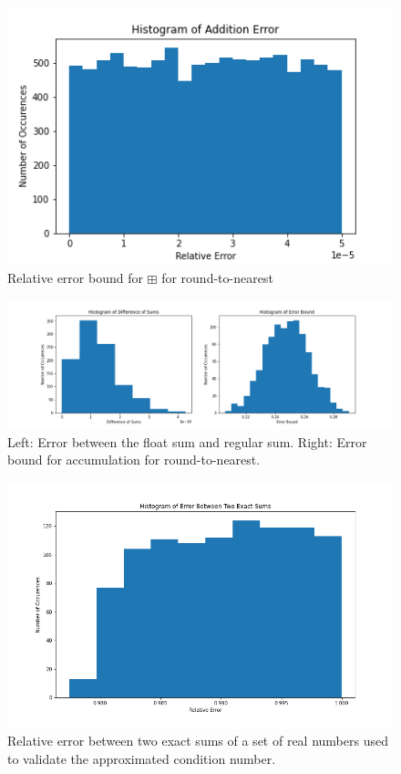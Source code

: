 \documentclass[11pt]{article}
\begin{document}
\begin{figure}[h!]
	\centering
	\includegraphics[width=0.8\linewidth]{../figures/Correctness Histogram}
	\caption{Relative error bound for $\boxplus$ for round-to-nearest}
	\label{fig:correctness}
\end{figure}

\begin{figure}[h!]
	\centering
	\includegraphics[width=1.2\linewidth]{../figures/Accumulation Histogram}
	\caption{Left: Error between the float sum and regular sum. Right: Error bound for accumulation for round-to-nearest.}
	\label{fig:accumulation}
\end{figure}

\begin{figure}[h!]
	\centering
	\includegraphics[width=\linewidth]{../figures/Condition Number Histogram}
	\caption{Relative error between two exact sums of a set of real numbers used to validate the approximated condition number.}
	\label{fig:condition}
\end{figure}
\end{document}

